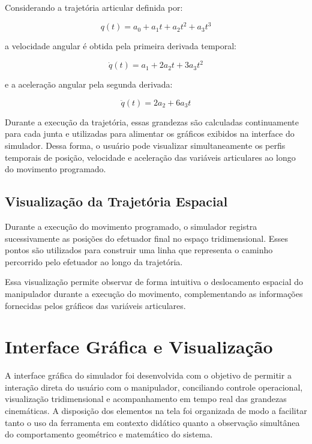 Considerando a trajetória articular definida por:

\begin{equation}
q(t) = a_0 + a_1 t + a_2 t^2 + a_3 t^3
\end{equation}

a velocidade angular é obtida pela primeira derivada temporal:

\begin{equation}
\dot{q}(t) = a_1 + 2a_2 t + 3a_3 t^2
\end{equation}

e a aceleração angular pela segunda derivada:

\begin{equation}
\ddot{q}(t) = 2a_2 + 6a_3 t
\end{equation}

Durante a execução da trajetória, essas grandezas são calculadas continuamente para cada junta e utilizadas para alimentar os gráficos exibidos na interface do simulador. Dessa forma, o usuário pode visualizar simultaneamente os perfis temporais de posição, velocidade e aceleração das variáveis articulares ao longo do movimento programado.

\subsection{Visualização da Trajetória Espacial}

Durante a execução do movimento programado, o simulador registra sucessivamente as posições do efetuador final no espaço tridimensional. Esses pontos são utilizados para construir uma linha que representa o caminho percorrido pelo efetuador ao longo da trajetória.

Essa visualização permite observar de forma intuitiva o deslocamento espacial do manipulador durante a execução do movimento, complementando as informações fornecidas pelos gráficos das variáveis articulares.

\section{Interface Gráfica e Visualização}

A interface gráfica do simulador foi desenvolvida com o objetivo de permitir a interação direta do usuário com o manipulador, conciliando controle operacional, visualização tridimensional e acompanhamento em tempo real das grandezas cinemáticas. A disposição dos elementos na tela foi organizada de modo a facilitar tanto o uso da ferramenta em contexto didático quanto a observação simultânea do comportamento geométrico e matemático do sistema.

